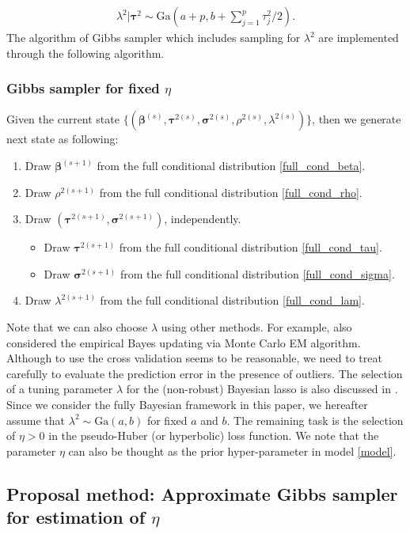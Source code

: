 \documentclass[11pt]{article}
\theoremstyle{plain}
\theoremstyle{definition}
\begin{document}
\begin{align}\label{full_cond_lam}
\lambda^2|\bm{\tau}^2 \sim \mathrm{Ga}\left(a+p, b+ \sum_{j=1}^p \tau_j^2/2\right).
\end{align}
The algorithm of Gibbs sampler which includes sampling for $\lambda^2$ are implemented through the following algorithm.

\subsubsection*{Gibbs sampler for fixed $\eta$}
Given the current state $\{(\bm{\beta}^{(s)}, \bm{\tau}^{2(s)}, \bm{\sigma}^{2(s)},\rho^{2(s)},\lambda^{2(s)})\}$, then we generate next state  as following:
\begin{enumerate}
\item Draw $\bm{\beta}^{(s+1)}$ from the full conditional distribution \eqref{full_cond_beta}. 
\item Draw $\rho^{2(s+1)}$ from the full conditional distribution \eqref{full_cond_rho}. 
\item Draw $(\bm{\tau}^{2(s+1)},\bm{\sigma}^{2(s+1)})$, independently.
\begin{itemize}
\item Draw $\bm{\tau}^{2(s+1)}$ from the full conditional distribution \eqref{full_cond_tau}.
\item Draw $\bm{\sigma}^{2(s+1)}$ from the full conditional distribution \eqref{full_cond_sigma}.
\end{itemize}
\item Draw $\lambda^{2(s+1)}$ from the full conditional distribution \eqref{full_cond_lam}.
\end{enumerate}
Note that we can also choose $\lambda$ using other methods. For example, \cite{PC08} also considered the empirical Bayes updating via Monte Carlo EM algorithm. Although to use the cross validation seems to be reasonable, we need to treat carefully to evaluate the prediction error in the presence of outliers. The selection of a tuning parameter $\lambda$ for the (non-robust) Bayesian lasso is also discussed in \cite{LN13}. Since we consider the fully Bayesian framework in this paper, we hereafter assume that $\lambda^2 \sim \mathrm{Ga}(a,b)$ for fixed $a$ and $b$. The remaining task is the selection of $\eta>0$ in the pseudo-Huber (or hyperbolic) loss function. We note that the parameter $\eta$ can also be thought as the prior hyper-parameter in model \eqref{model}. 


\subsection{Proposal method: Approximate Gibbs sampler for estimation of $\eta$}
\label{subsec:3.2}
\end{document}
